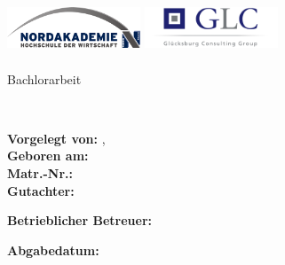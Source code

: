 \thispagestyle{empty}
\vspace{2cm}
\begin{center}
\includegraphics[height=60px, width= 150px]{images/uni-logo} 
\hspace{2cm}
\includegraphics[height=60px, width= 150px]{images/Logo-GLC1} %
\\\vspace{2cm}

\Large{\dctitle}

\vspace{1cm}
\large{Bachlorarbeit}

\vspace{5mm}
\large{\dcfaculty\\ \dcuniversity}
\vspace{1	cm}
\end{center}
{\large
\begin{flushleft}
\textbf{Vorgelegt von:} \dcauthorsurname, \dcauthorname \\
\textbf{Geboren am:} \dcauthoradd\\
\textbf{Matr.-Nr.:} \dcauthorno \\
\textbf{Gutachter:} \\
\begin{tightlist}
	\item \dcapprovala
	\item \dcapprovalb
\end{tightlist}

\textbf{Betrieblicher Betreuer:} \\
\begin{tightlist}
	\item \dcada
\end{tightlist}
\vspace{5mm}
\textbf{Abgabedatum:} \dcdatesubmitted\\
\end{flushleft}
}
\vspace{1cm}

\newpage
